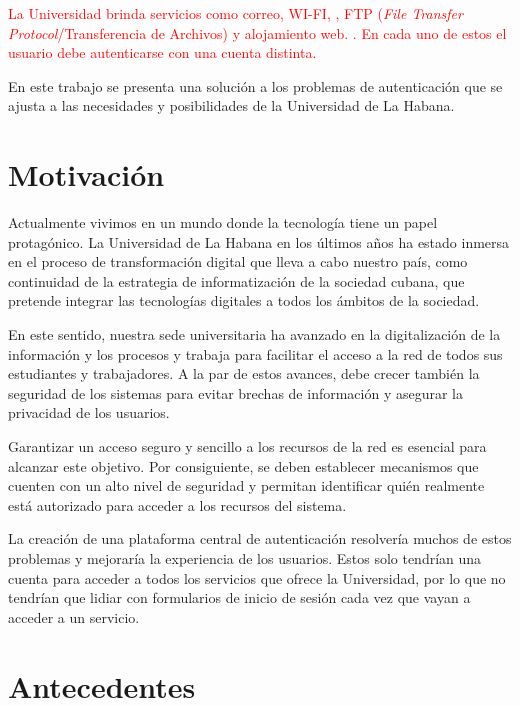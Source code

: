 \textcolor{red}{La Universidad brinda servicios como correo, WI-FI, , FTP (\textit{File Transfer Protocol}/Transferencia de Archivos) y alojamiento web. . En cada uno de estos el usuario debe autenticarse con una cuenta distinta.}

En este trabajo se presenta una solución a los problemas de autenticación que se ajusta a las necesidades y posibilidades de la Universidad de La Habana.  

\section*{Motivación}
Actualmente vivimos en un mundo donde la tecnología tiene un papel protagónico. La Universidad de La Habana en los últimos años ha estado inmersa en el proceso de transformación digital que lleva a cabo nuestro país, como continuidad de la estrategia de informatización de la sociedad cubana, que pretende integrar las tecnologías digitales a todos los ámbitos de la sociedad.

En este sentido, nuestra sede universitaria ha avanzado en la digitalización de la información y los procesos y trabaja para facilitar el acceso a la red de todos sus estudiantes y trabajadores. A la par de estos avances, debe crecer también la seguridad de los sistemas para evitar brechas de información y asegurar la privacidad de los usuarios.

Garantizar un acceso seguro y sencillo a los recursos de la red es esencial para alcanzar este objetivo. Por consiguiente, se deben establecer mecanismos que cuenten con un alto nivel de seguridad y permitan identificar quién realmente está autorizado para acceder a los recursos del sistema.

La creación de una plataforma central de autenticación resolvería muchos de estos problemas y mejoraría la experiencia de los usuarios. Estos solo tendrían una cuenta para acceder a todos los servicios que ofrece la Universidad, por lo que no tendrían que lidiar con formularios de inicio de sesión cada vez que vayan a acceder a un servicio.


\section*{Antecedentes}

